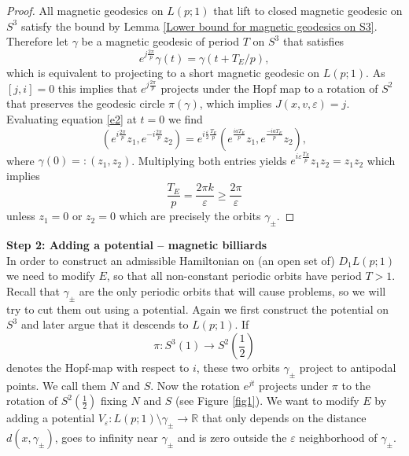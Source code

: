 \documentclass[12pt]{article}
\def\gc{{\gamma}}
\newcommand{\R}{\mathbb{R}} %
\begin{document}
\begin{proof}
    All magnetic geodesics on $L(p;1)$ that lift to closed magnetic geodesic on $S^3$ satisfy the bound by Lemma \ref{Lower bound for magnetic geodesics on S3}. Therefore let $\gamma$ be a magnetic geodesic of period $T$ on $S^3$ that satisfies 
    \begin{equation}\label{e2}
        e^{j\frac{2\pi}{p}}\gamma(t)=\gamma(t+T_E/p),
    \end{equation}
    which is equivalent to projecting to a short magnetic geodesic on $L(p;1)$. As $[j,i]=0$ this implies that $e^{j\frac{2\pi}{p}}$ projects under the Hopf map to a rotation of $S^2$ that preserves the geodesic circle $\pi(\gamma)$, which implies $J(x,v,\varepsilon)=j$. Evaluating equation \eqref{e2} at $t=0$ we find
    $$
    (e^{i\frac{2\pi}{p}}z_1,e^{-i\frac{2\pi}{p}}z_2)=e^{i\frac{\varepsilon}{2}\frac{T_E}{p}}(e^{\frac{iaT_E}{p}}z_1,e^{\frac{-iaT_E}{p}}z_2),
    $$
    where $\gamma(0)=:(z_1,z_2)$. Multiplying both entries yields $e^{i\varepsilon \frac{T_E}{p}}z_1z_2=z_1z_2$ which implies
    $$
    \frac{T_E}{p}=\frac{2\pi k}{\varepsilon}\geq\frac{2\pi}{\varepsilon}
    $$
    unless $z_1=0$ or $z_2=0$ which are precisely the orbits $\gamma_\pm$.
\end{proof}

\noindent
\textbf{Step 2: Adding a potential -- magnetic billiards}\\
In order to construct an admissible Hamiltonian on (an open set of) $D_1L(p;1)$ we need to modify $E$, so that all non-constant periodic orbits have period $T>1$. Recall that  $\gamma_\pm$ are the only periodic orbits that will cause problems, so we will try to cut them out using a potential. Again we first construct the potential on $S^3$ and later argue that it descends to $L(p;1)$. If 
$$
\pi: S^3(1)\to S^2\left (\frac{1}{2}\right)
$$
denotes the Hopf-map with respect to $i$, these two orbits $\gc_{\pm}$ project to antipodal points. We call them $N$ and $S$. Now the rotation $e^{jt}$ projects under $\pi$ to the rotation of $S^2(\frac{1}{2})$ fixing $N$ and $S$ (see Figure \ref{fig1}). We want to modify $E$ by adding a potential $ V_\varepsilon:L(p;1)\setminus \gamma_\pm\to \R$ that only depends on the distance $d(x,\gamma_\pm)$, goes to infinity near $\gamma_\pm$ and is zero outside the $\varepsilon$ neighborhood of $\gamma_\pm$. 
\end{document}
